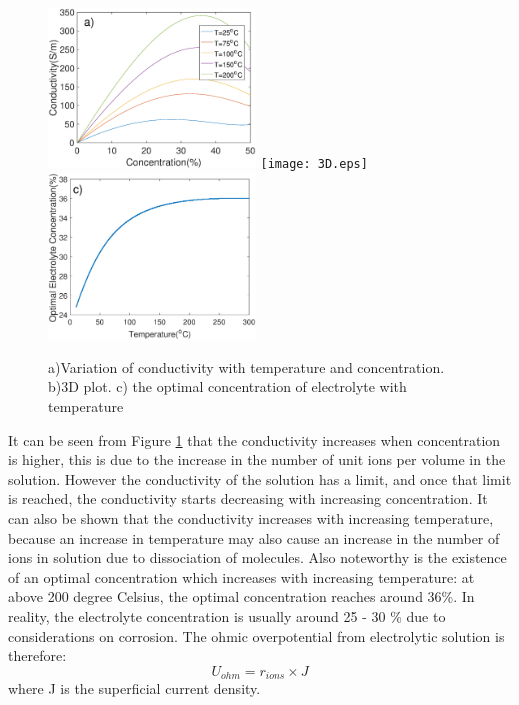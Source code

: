 \begin{figure}[h] 
\includegraphics[width=5.5cm] {cond.eps} 
\texttt{[image: 3D.eps]}
\includegraphics[width = 5.5cm]{optimum.eps}
\caption{ a)Variation of conductivity with temperature and concentration. b)3D plot. c) the optimal concentration of electrolyte with temperature} 
\label{fig:3D}
\end{figure} 
It can be seen from Figure \ref{fig:3D} that the conductivity increases when concentration is higher, this is due to the increase in the number of unit ions per volume in the solution. However the conductivity of the solution has a limit, and once that limit is reached, the conductivity starts decreasing with increasing concentration. It can also be shown that the conductivity increases with increasing temperature, because an increase in temperature may also cause an increase in the number of ions in solution due to dissociation of molecules. Also noteworthy is the existence of an optimal concentration which increases with increasing temperature: at above 200 degree Celsius, the optimal concentration reaches around 36\%. In reality, the electrolyte concentration is usually around 25 - 30 \% due to considerations on corrosion.
The ohmic overpotential from electrolytic solution is therefore:\
\begin{equation} 
U_{ohm} = r_{ions} \times J
\end{equation} 
where J is the superficial current density. 



